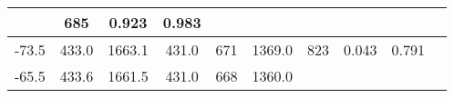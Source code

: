 \documentclass[a4paper,10pt]{article}
\begin{document}
\begin{longtable}{
     |
%    
    c|
%    
    c|
%    
    c|
%    
    c|
%    
    c|
%    
    c|
%    
    c|
%    
    c|
%    
    c|
%    
    c|
%    
    }
%        
        & 685
%        

%        

%        
        & 0.923
%        

%        

%        
        & 0.983
%        

%        
        \\
        \hline

        

%        

%        
        -73.5
%        

%        

%        
        & 433.0
%        

%        

%        
        & 1663.1
%        

%        

%        
        & 431.0
%        

%        

%        
        & 671
%        

%        

%        
        & 1369.0
%        

%        

%        
        & 823
%        

%        

%        
        & 0.043
%        

%        

%        
        & 0.791
%        

%        
        \\
        \hline

        

%        

%        
        -65.5
%        

%        

%        
        & 433.6
%        

%        

%        
        & 1661.5
%        

%        

%        
        & 431.0
%        

%        

%        
        & 668
%        

%        

%        
        & 1360.0
%        

%        


\end{longtable}
\end{document}
